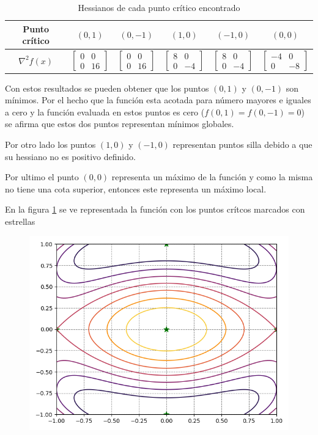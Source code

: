 \begin{table}[H]
    \centering
    \begin{tabular}{cccccc} \hline
        \textbf{Punto crítico} & $(0,1)$                      & $(0,-1)$                     & $(1,0)$                      & $(-1,0)$                     & $(0,0)$                      \\  [0.125cm] \hline
        $\nabla^2 f(x)$        & $\begin{bmatrix} 0 & 0 \\  0 & 16\end{bmatrix} $ & $\begin{bmatrix} 0 & 0 \\  0 & 16\end{bmatrix} $ & $\begin{bmatrix} 8 & 0 \\  0 & -4\end{bmatrix} $ & $\begin{bmatrix} 8 & 0 \\  0 & -4\end{bmatrix} $ & $\begin{bmatrix} -4 & 0 \\  0 & -8\end{bmatrix}$ \\ \hline
    \end{tabular}
    \caption{Hessianos de cada punto crítico encontrado}
\end{table}

Con estos resultados se pueden obtener que los puntos $(0,1)$ y $(0,-1)$ son mínimos. Por el hecho que la función esta acotada para número mayores e iguales a cero y la función evaluada en estos puntos  es cero ($f(0,1)=f(0,-1)=0$) se afirma que estos dos puntos representan mínimos globales.

Por otro lado los puntos $(1,0)$ y $(-1,0)$ representan puntos silla debido a que su hessiano no es positivo definido.

Por ultimo el punto $(0,0)$ representa un máximo de la función y como la misma no tiene una cota superior, entonces este representa un máximo local.

En la figura \ref{fig} se ve representada la función con los puntos crítcos marcados con estrellas

\begin{figure}[H]
    \centering
    \includegraphics[width=16cm]{Graphics/Problema_01.png}
    \caption{}
    \label{fig}
\end{figure}